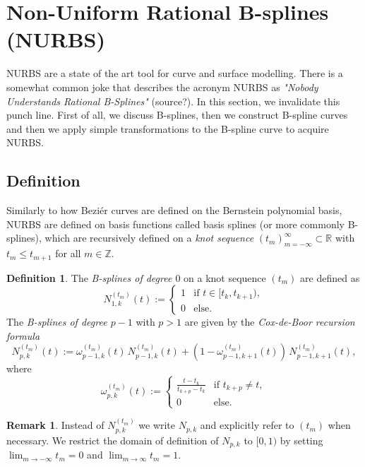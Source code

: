 \documentclass[a4paper, 11pt]{report}
\theoremstyle{definition}
\newtheorem{definition}{Definition}[section]
\newtheorem*{remark}{Remark}
\renewcommand{\emph}[1]{\textit{#1}}
\begin{document}
\section{Non-Uniform Rational B-splines (NURBS)}
NURBS are a state of the art tool for curve and surface modelling. There is a somewhat common joke that describes the acronym NURBS as \emph{"Nobody Understands Rational B-Splines"} (source?). In this section, we invalidate this punch line. First of all, we discuss B-splines, then we construct B-spline curves and then we apply simple transformations to the B-spline curve to acquire NURBS.

\subsection{Definition}
Similarly to how Beziér curves are defined on the Bernstein polynomial basis, NURBS are defined on basis functions called basis splines (or more commonly B-splines), which are recursively defined on a \emph{knot sequence} $(t_m)_{m=-\infty}^{\infty} \subset \mathbb{R}$ with $t_{m} \leq t_{m+1}$ for all $m \in \mathbb{Z}$.

\begin{definition}
	The \emph{B-splines of degree $0$} on a knot sequence $(t_m)$ are defined as
	\begin{equation}
		N^{(t_m)}_{1,k}(t) :=
		\begin{cases}
			1 & \text{if } t \in [t_k, t_{k+1}),\\
			0 & \text{else.}
		\end{cases}
	\end{equation}
	The \emph{B-splines of degree $p-1$} with $p > 1$ are given by the \emph{Cox-de-Boor recursion formula}
	\begin{equation}\label{eq:coxdeboorrec}
		N_{p,k}^{(t_m)}(t) := \omega^{(t_m)}_{p-1, k}(t) \, N^{(t_m)}_{p-1, k}(t) + (1-\omega^{(t_m)}_{p-1, k+1}(t)) \, N^{(t_m)}_{p-1, k+1}(t),
	\end{equation}
	where
	\begin{equation}
		\omega^{(t_m)}_{p,k}(t) := 
		\begin{cases}
			\frac{t-t_k}{t_{k+p} - t_k} &\text{if } t_{k+p} \neq t,\\
			0 							&\text{else.}
		\end{cases}
	\end{equation}
\end{definition}

\begin{remark}
	Instead of $N_{p,k}^{(t_m)}$ we write $N_{p,k}$ and explicitly refer to $(t_m)$ when necessary. We restrict the domain of definition of $N_{p,k}$ to $[0, 1)$ by setting $\lim_{m \to -\infty} t_m = 0$ and $\lim_{m \to \infty} t_m = 1$.
\end{remark}
\end{document}
